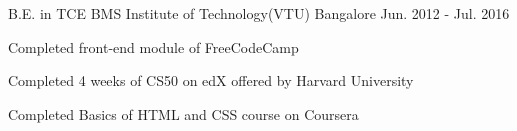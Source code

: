 

\begin{cventries}

  \cventry
  {B.E. in TCE} %
  {BMS Institute of Technology(VTU)} %
  {Bangalore} %
  {Jun. 2012 - Jul. 2016} %
  {
    \begin{cvitems} %
      \item {Completed front-end module of FreeCodeCamp}
      \item {Completed 4 weeks of CS50 on edX offered by Harvard University}
      \item {Completed Basics of HTML and CSS course on Coursera}
    \end{cvitems}
  }

\end{cventries}
